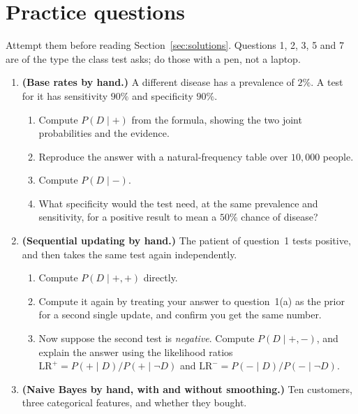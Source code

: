 \documentclass[11pt]{article}
\begin{document}
\section{Practice questions}
\label{sec:practice}

Attempt them before reading Section~\ref{sec:solutions}. Questions 1, 2, 3, 5
and 7 are of the type the class test asks; do those with a pen, not a laptop.

\begin{enumerate}[leftmargin=*, itemsep=0.55em]

\item \textbf{(Base rates by hand.)} A different disease has a prevalence of
  $2\%$. A test for it has sensitivity $90\%$ and specificity $90\%$.
  \begin{enumerate}[label=(\alph*)]
    \item Compute $P(D \mid +)$ from the formula, showing the two joint
      probabilities and the evidence.
    \item Reproduce the answer with a natural-frequency table over
      $10{,}000$ people.
    \item Compute $P(D \mid -)$.
    \item What specificity would the test need, at the same prevalence and
      sensitivity, for a positive result to mean a $50\%$ chance of disease?
  \end{enumerate}

\item \textbf{(Sequential updating by hand.)} The patient of question~1
  tests positive, and then takes the same test again independently.
  \begin{enumerate}[label=(\alph*)]
    \item Compute $P(D \mid +,+)$ directly.
    \item Compute it again by treating your answer to question~1(a) as the
      prior for a second single update, and confirm you get the same number.
    \item Now suppose the second test is \emph{negative}. Compute
      $P(D \mid +,-)$, and explain the answer using the likelihood ratios
      $\text{LR}^{+} = P(+ \mid D)/P(+ \mid \lnot D)$ and
      $\text{LR}^{-} = P(- \mid D)/P(- \mid \lnot D)$.
  \end{enumerate}

\item \textbf{(Naive Bayes by hand, with and without smoothing.)} Ten
  customers, three categorical features, and whether they bought.


\end{enumerate}
\end{document}
